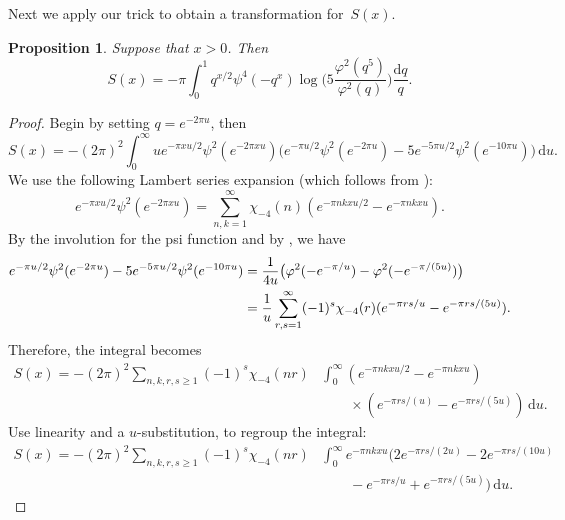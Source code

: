 \documentclass[12pt,reqno]{amsart}
\newtheorem{proposition}{Proposition}
\theoremstyle{remark}
\begin{document}
Next we apply our trick to obtain a transformation for~$S(x)$.

\begin{proposition}
\label{prop5}
Suppose that $x>0$. Then
\begin{equation}\label{S(x) reduced}
S(x)=-\pi\int_{0}^{1}q^{x/2}\psi^4(-q^x)\log\biggl(5\frac{\varphi^2(q^{5})}{\varphi^2(q)}\biggr)\frac{{{\mathrm d}} q}{q}.
\end{equation}
\end{proposition}

\begin{proof}
Begin by setting $q=e^{-2\pi u}$, then
\begin{equation*}
S(x)=-(2\pi)^2\int_{0}^{\infty}u e^{-\pi xu/2}\psi^2(e^{-2\pi x u})
\bigl(e^{-\pi u/2}\psi^2(e^{-2\pi u})-5e^{-5\pi u/2}\psi^2(e^{-10\pi u})\bigr)\,{{\mathrm d}} u.
\end{equation*}
We use the following Lambert series expansion (which follows from
\cite[pg.~139, Example 4]{Be3}):
\begin{equation*}
e^{-\pi x u/2}\psi^2(e^{-2\pi x u})
=\sum_{n,k=1}^{\infty}\chi_{-4}(n)(e^{-\pi n k x u/2}-e^{-\pi n k x u}).
\end{equation*}
By the involution for the psi function and by \cite[pg.~114, Entry 8.1]{Be3}, we have
\begin{align}
e^{-\pi u/2}\psi^2(e^{-2\pi u})-5e^{-5\pi u/2}\psi^2(e^{-10\pi u})
&=\frac{1}{4u}\bigl(\varphi^2(-e^{-\pi/u})-\varphi^2(-e^{-\pi/(5u)})\bigr)
\notag\\
&=\frac{1}{u}\sum_{r,s=1}^{\infty}(-1)^s \chi_{-4}(r)(e^{-\pi r s/u}-e^{-\pi r s/(5u)}).
\notag
\end{align}
Therefore, the integral becomes
\begin{equation*}
\begin{split}
S(x)
=-(2\pi)^2\sum_{n,k,r,s\ge 1}(-1)^s\chi_{-4}(n r)
&\int_{0}^{\infty}(e^{-\pi n k x u/2}-e^{-\pi n k x u})
\\ &\qquad\times
(e^{-\pi r s/(u)}-e^{-\pi r s/(5 u)})\,{{\mathrm d}} u.
\end{split}
\end{equation*}
Use linearity and a $u$-substitution, to regroup the integral:
\begin{equation*}
\begin{split}
S(x)=-(2\pi)^2\sum_{n,k,r,s\ge 1}(-1)^s\chi_{-4}(n r)
&\int_{0}^{\infty}e^{-\pi n k x u}(2e^{-\pi r s/(2 u)}-2e^{-\pi r s/(10 u)}
\\ &\qquad
-e^{-\pi r s/u}+e^{-\pi r s/(5 u)})\, {{\mathrm d}} u.

\end{split}
\end{equation*}
\end{proof}
\end{document}
